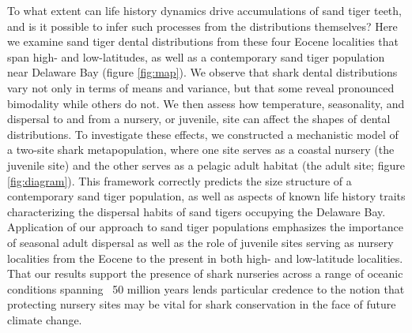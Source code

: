 \documentclass[]{rsos}%
\begin{document}
To what extent can life history dynamics drive accumulations of sand tiger teeth, and is it possible to infer such processes from the distributions themselves?
Here we examine sand tiger dental distributions from these four Eocene localities that span high- and low-latitudes, as well as a contemporary sand tiger population near Delaware Bay (figure \ref{fig:map}).
We observe that shark dental distributions vary not only in terms of means and variance, but that some reveal pronounced bimodality while others do not.
We then assess how temperature, seasonality, and dispersal to and from a nursery, or juvenile, site can affect the shapes of dental distributions.
To investigate these effects, we constructed a mechanistic model of a two-site shark metapopulation, where one site serves as a coastal nursery (the juvenile site) and the other serves as a pelagic adult habitat (the adult site; figure \ref{fig:diagram}). 
This framework correctly predicts the size structure of a contemporary sand tiger population, as well as aspects of known life history traits characterizing the dispersal habits of sand tigers occupying the Delaware Bay.
Application of our approach to sand tiger populations emphasizes the importance of seasonal adult dispersal as well as the role of juvenile sites serving as nursery localities from the Eocene to the present in both high- and low-latitude localities.
That our results support the presence of shark nurseries across a range of oceanic conditions spanning ~50 million years lends particular credence to the notion that protecting nursery sites may be vital for shark conservation in the face of future climate change.
\end{document}
